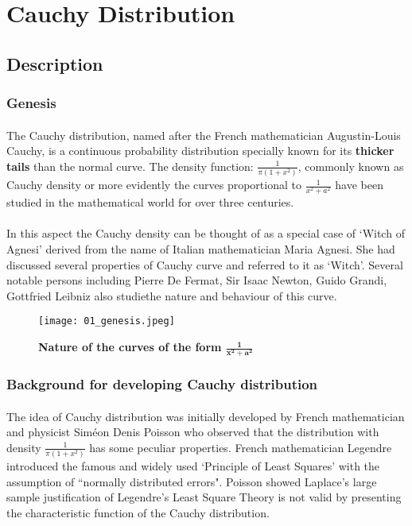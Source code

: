 \documentclass[12pt, fleqn, a4paper]{article}
\begin{document}
	\newpage
	\section{Cauchy Distribution}
	\subsection{Description}
	\subsubsection{Genesis}
	\paragraph{} The Cauchy distribution, named after the French mathematician Augustin-Louis Cauchy, is a continuous probability distribution specially known for its \textbf{thicker tails} than the normal curve. The density function: \(\frac{1}{\pi(1+x^2)}\), commonly known as Cauchy density or more evidently the curves proportional to \(\frac{1}{x^2+a^2}\) have been studied in the mathematical world for over three centuries. 
	\paragraph{} In this aspect the Cauchy density can be thought of as a special case of `Witch of Agnesi' derived from the name of Italian mathematician Maria Agnesi. She had discussed several properties of Cauchy curve and referred to it as `Witch'. Several notable persons including Pierre De Fermat, Sir Isaac Newton, Guido Grandi, Gottfried Leibniz also studiethe nature and behaviour of this curve.
	\begin{figure}[H]
		\texttt{[image: 01\_genesis.jpeg]}
		\caption{\textbf{Nature of the curves of the form \(\mathbf{\frac{1}{x^2+a^2}}\)}}
	\end{figure}
	
	\subsubsection{Background for developing Cauchy distribution}
	\paragraph{} The idea of Cauchy distribution was initially developed by French mathematician and physicist Sim\'eon Denis Poisson who observed that the distribution with density \(\frac{1}{\pi(1+x^2)}\) has some peculiar properties. French mathematician  Legendre introduced the famous and widely used `Principle of Least Squares' with the assumption of ``normally distributed errors". Poisson showed Laplace's large sample justification of Legendre's Least Square Theory is not valid by presenting the characteristic function of the Cauchy distribution. 
\end{document}
